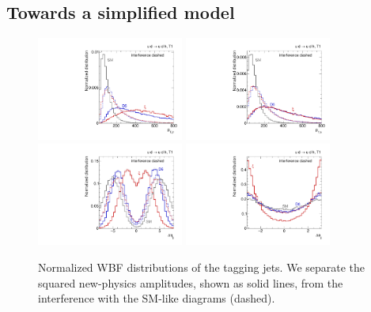 \subsection{Towards a simplified model}
\label{sec:validity_simplified}

\begin{figure}[t]
  \includegraphics[width=0.43\textwidth]{fig/validity/WBF_separate_T1_j1pt.pdf} 
  \hspace*{0.05\textwidth}
  \includegraphics[width=0.43\textwidth]{fig/validity/WBF_separate_T1_Hpt.pdf}\\
  \includegraphics[width=0.43\textwidth]{fig/validity/WBF_separate_T1_deltaEtaJJ.pdf} 
  \hspace*{0.05\textwidth}
  \includegraphics[width=0.43\textwidth]{fig/validity/WBF_separate_T1_deltaPhiJJ.pdf}
  \caption{Normalized WBF distributions of the tagging jets. We separate
    the squared new-physics amplitudes, shown as solid lines, from the
    interference with the SM-like diagrams (dashed).}
  \label{fig:validity_squared_separate}
\end{figure}

